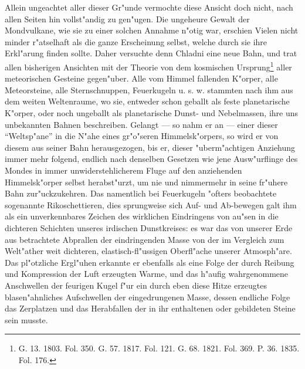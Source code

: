 \documentclass[a4paper, 8pt, oneside, polutonikogreek, german]{article}
\begin{document}
Allein ungeachtet aller dieser Gr"unde vermochte diese Ansicht doch nicht, nach allen Seiten hin vollst"andig zu gen"ugen. Die ungeheure Gewalt der Mondvulkane, wie sie zu einer solchen Annahme n"otig war, erschien Vielen nicht minder r"atselhaft als die ganze Erscheinung selbst, welche durch sie ihre Erkl"arung finden sollte. Daher versuchte denn Chladni eine neue Bahn, und trat allen bisherigen Ansichten mit der Theorie von dem kosmischen Ursprung\footnote{G. 13. 1803. Fol. 350. G. 57. 1817. Fol. 121. G. 68. 1821. Fol. 369. P. 36. 1835. Fol. 176.} aller meteorischen Gesteine gegen"uber. Alle vom Himmel fallenden K"orper, alle Meteorsteine, alle Sternschnuppen, Feuerkugeln u. s. w. stammten nach ihm aus dem weiten Weltenraume, wo sie, entweder schon geballt als feste planetarische K"orper, oder noch ungeballt als planetarische Dunst- und Nebelmassen, ihre uns unbekannten Bahnen beschreiben. Gelangt --- so nahm er an --- einer dieser "`Weltsp"ane"' in die N"ahe eines gr"o"seren Himmelsk"orpers, so wird er von diesem aus seiner Bahn herausgezogen, bis er, dieser "uberm"achtigen Anziehung immer mehr folgend, endlich nach denselben Gesetzen wie jene Ausw"urflinge des Mondes in immer unwiderstehlicherem Fluge auf den anziehenden Himmelsk"orper selbst herabst"urzt, um nie und nimmermehr in seine fr"uhere Bahn zur"uckzukehren. Das namentlich bei Feuerkugeln "ofters beobachtete sogenannte Rikoschettieren, dies sprungweise sich Auf- und Ab-bewegen galt ihm als ein unverkennbares Zeichen des wirklichen Eindringens von au"sen in die dichteren Schichten unseres irdischen Dunstkreises: es war das von unserer Erde aus betrachtete Abprallen der eindringenden Masse von der im Vergleich zum Welt"ather weit dichteren, elastisch-fl"ussigen Oberfl"ache unserer Atmosph"are. Das pl"otzliche Ergl"uhen erkannte er ebenfalls als eine Folge der durch Reibung und Kompression der Luft erzeugten Warme, und das h"aufig wahrgenommene Anschwellen der feurigen Kugel f"ur ein durch eben diese Hitze erzeugtes blasen"ahnliches Aufschwellen der eingedrungenen Masse, dessen endliche Folge das Zerplatzen und das Herabfallen der in ihr enthaltenen oder gebildeten Steine sein musste.
\end{document}
